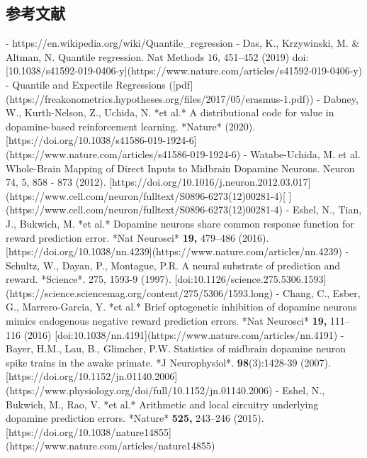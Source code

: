 \subsection{参考文献}- https://en.wikipedia.org/wiki/Quantile_regression
- Das, K., Krzywinski, M. & Altman, N. Quantile regression. Nat Methods 16, 451–452 (2019) doi:[10.1038/s41592-019-0406-y](https://www.nature.com/articles/s41592-019-0406-y)
- Quantile and Expectile Regressions ([pdf](https://freakonometrics.hypotheses.org/files/2017/05/erasmus-1.pdf))
- Dabney, W., Kurth-Nelson, Z., Uchida, N. *et al.* A distributional code for value in dopamine-based reinforcement learning. *Nature* (2020). [https://doi.org/10.1038/s41586-019-1924-6](https://www.nature.com/articles/s41586-019-1924-6)
- Watabe-Uchida, M. et al. Whole-Brain Mapping of Direct Inputs to Midbrain Dopamine Neurons. Neuron 74, 5, 858 - 873 (2012). [https://doi.org/10.1016/j.neuron.2012.03.017](https://www.cell.com/neuron/fulltext/S0896-6273(12)00281-4)[ ](https://www.cell.com/neuron/fulltext/S0896-6273(12)00281-4)
- Eshel, N., Tian, J., Bukwich, M. *et al.* Dopamine neurons share common response function for reward prediction error. *Nat Neurosci* \textbf{19,} 479–486 (2016). [https://doi.org/10.1038/nn.4239](https://www.nature.com/articles/nn.4239)
- Schultz, W., Dayan, P., Montague, P.R. A neural substrate of prediction and reward. *Science*. 275, 1593-9 (1997). [doi:10.1126/science.275.5306.1593](https://science.sciencemag.org/content/275/5306/1593.long)
- Chang, C., Esber, G., Marrero-Garcia, Y. *et al.* Brief optogenetic inhibition of dopamine neurons mimics endogenous negative reward prediction errors. *Nat Neurosci* \textbf{19,} 111–116 (2016) [doi:10.1038/nn.4191](https://www.nature.com/articles/nn.4191)  
- Bayer, H.M., Lau, B., Glimcher, P.W. Statistics of midbrain dopamine neuron spike trains in the awake primate. *J Neurophysiol*. \textbf{98}(3):1428-39 (2007). [https://doi.org/10.1152/jn.01140.2006](https://www.physiology.org/doi/full/10.1152/jn.01140.2006)
- Eshel, N., Bukwich, M., Rao, V. *et al.* Arithmetic and local circuitry underlying dopamine prediction errors. *Nature* \textbf{525,} 243–246 (2015). [https://doi.org/10.1038/nature14855](https://www.nature.com/articles/nature14855)